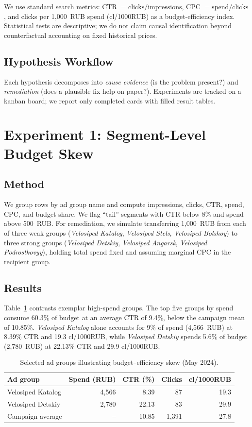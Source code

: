 \documentclass{article}
\begin{document}
We use standard search metrics: CTR $= \text{clicks}/\text{impressions}$, CPC $= \text{spend}/\text{clicks}$, and clicks per 1{,}000~RUB spend (cl/1000RUB) as a budget-efficiency index. Statistical tests are descriptive; we do not claim causal identification beyond counterfactual accounting on fixed historical prices.

\subsection{Hypothesis Workflow}

Each hypothesis decomposes into \emph{cause evidence} (is the problem present?) and \emph{remediation} (does a plausible fix help on paper?). Experiments are tracked on a kanban board; we report only completed cards with filled result tables.

\section{Experiment 1: Segment-Level Budget Skew}

\subsection{Method}

We group rows by ad group name and compute impressions, clicks, CTR, spend, CPC, and budget share. We flag ``tail'' segments with CTR below 8\% and spend above 500~RUB. For remediation, we simulate transferring 1{,}000~RUB from each of three weak groups (\emph{Velosiped Katalog}, \emph{Velosiped Stels}, \emph{Velosiped Bolshoy}) to three strong groups (\emph{Velosiped Detskiy}, \emph{Velosiped Angarsk}, \emph{Velosiped Podrostkovyy}), holding total spend fixed and assuming marginal CPC in the recipient group.

\subsection{Results}

Table~\ref{tab:groups} contrasts exemplar high-spend groups. The top five groups by spend consume 60.3\% of budget at an average CTR of 9.4\%, below the campaign mean of 10.85\%. \emph{Velosiped Katalog} alone accounts for 9\% of spend (4{,}566~RUB) at 8.39\% CTR and 19.3 cl/1000RUB, while \emph{Velosiped Detskiy} spends 5.6\% of budget (2{,}780~RUB) at 22.13\% CTR and 29.9 cl/1000RUB.

\begin{table}[ht]
\centering
\caption{Selected ad groups illustrating budget--efficiency skew (May 2024).}
\label{tab:groups}
\begin{tabular}{lrrrr}
\toprule
Ad group & Spend (RUB) & CTR (\%) & Clicks & cl/1000RUB \\
\midrule
Velosiped Katalog & 4{,}566 & 8.39 & 87 & 19.3 \\
Velosiped Detskiy & 2{,}780 & 22.13 & 83 & 29.9 \\
Campaign average & -- & 10.85 & 1{,}391 & 27.8 \\
\bottomrule
\end{tabular}
\end{table}
\end{document}
